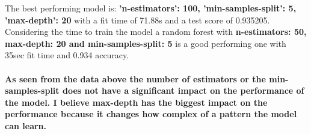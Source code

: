 \documentclass{article}
\begin{document}
The best performing model is: \textbf{'n-estimators': 100, 'min-samples-split': 5, 'max-depth': 20} with a fit time of 71.88s and a test score of 0.935205.
\\ Considering the time to train the model a random forest with \textbf{n-estimators: 50, max-depth: 20 and min-samples-split: 5} is a good performing one with 35sec fit time and 0.934 accuracy.

\paragraph[Comment]{
As seen from the data above the number of estimators or the min-samples-split does not have a significant impact on the performance of the model.
I believe max-depth has the biggest impact on the performance because it changes how complex of a pattern the model can learn.
}
\end{document}
